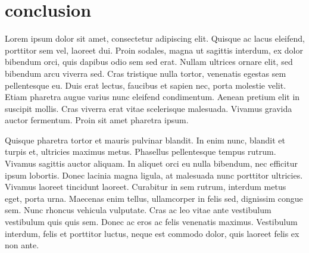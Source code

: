 \chapter*{conclusion}

 Lorem ipsum dolor sit amet, consectetur adipiscing elit. Quisque ac lacus eleifend, porttitor sem vel, laoreet dui. Proin sodales, magna ut sagittis interdum, ex dolor bibendum orci, quis dapibus odio sem sed erat. Nullam ultrices ornare elit, sed bibendum arcu viverra sed. Cras tristique nulla tortor, venenatis egestas sem pellentesque eu. Duis erat lectus, faucibus et sapien nec, porta molestie velit. Etiam pharetra augue varius nunc eleifend condimentum. Aenean pretium elit in suscipit mollis. Cras viverra erat vitae scelerisque malesuada. Vivamus gravida auctor fermentum. Proin sit amet pharetra ipsum.

Quisque pharetra tortor et mauris pulvinar blandit. In enim nunc, blandit et turpis et, ultricies maximus metus. Phasellus pellentesque tempus rutrum. Vivamus sagittis auctor aliquam. In aliquet orci eu nulla bibendum, nec efficitur ipsum lobortis. Donec lacinia magna ligula, at malesuada nunc porttitor ultricies. Vivamus laoreet tincidunt laoreet. Curabitur in sem rutrum, interdum metus eget, porta urna. Maecenas enim tellus, ullamcorper in felis sed, dignissim congue sem. Nunc rhoncus vehicula vulputate. Cras ac leo vitae ante vestibulum vestibulum quis quis sem. Donec ac eros ac felis venenatis maximus. Vestibulum interdum, felis et porttitor luctus, neque est commodo dolor, quis laoreet felis ex non ante. 